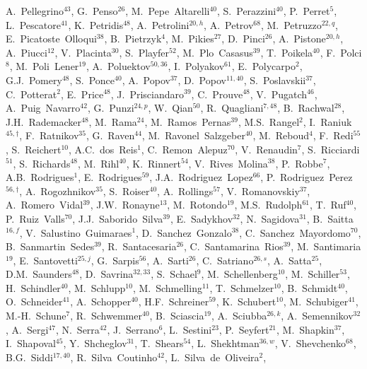 \documentclass[12pt,a4paper]{article}
\begin{document}
\begin{flushleft}
A.~Pellegrino$^{43}$,
G.~Penso$^{26}$,
M.~Pepe~Altarelli$^{40}$,
S.~Perazzini$^{40}$,
P.~Perret$^{5}$,
L.~Pescatore$^{41}$,
K.~Petridis$^{48}$,
A.~Petrolini$^{20,h}$,
A.~Petrov$^{68}$,
M.~Petruzzo$^{22,q}$,
E.~Picatoste~Olloqui$^{38}$,
B.~Pietrzyk$^{4}$,
M.~Pikies$^{27}$,
D.~Pinci$^{26}$,
A.~Pistone$^{20,h}$,
A.~Piucci$^{12}$,
V.~Placinta$^{30}$,
S.~Playfer$^{52}$,
M.~Plo~Casasus$^{39}$,
T.~Poikela$^{40}$,
F.~Polci$^{8}$,
M.~Poli~Lener$^{19}$,
A.~Poluektov$^{50,36}$,
I.~Polyakov$^{61}$,
E.~Polycarpo$^{2}$,
G.J.~Pomery$^{48}$,
S.~Ponce$^{40}$,
A.~Popov$^{37}$,
D.~Popov$^{11,40}$,
S.~Poslavskii$^{37}$,
C.~Potterat$^{2}$,
E.~Price$^{48}$,
J.~Prisciandaro$^{39}$,
C.~Prouve$^{48}$,
V.~Pugatch$^{46}$,
A.~Puig~Navarro$^{42}$,
G.~Punzi$^{24,p}$,
W.~Qian$^{50}$,
R.~Quagliani$^{7,48}$,
B.~Rachwal$^{28}$,
J.H.~Rademacker$^{48}$,
M.~Rama$^{24}$,
M.~Ramos~Pernas$^{39}$,
M.S.~Rangel$^{2}$,
I.~Raniuk$^{45,\dagger}$,
F.~Ratnikov$^{35}$,
G.~Raven$^{44}$,
M.~Ravonel~Salzgeber$^{40}$,
M.~Reboud$^{4}$,
F.~Redi$^{55}$,
S.~Reichert$^{10}$,
A.C.~dos~Reis$^{1}$,
C.~Remon~Alepuz$^{70}$,
V.~Renaudin$^{7}$,
S.~Ricciardi$^{51}$,
S.~Richards$^{48}$,
M.~Rihl$^{40}$,
K.~Rinnert$^{54}$,
V.~Rives~Molina$^{38}$,
P.~Robbe$^{7}$,
A.B.~Rodrigues$^{1}$,
E.~Rodrigues$^{59}$,
J.A.~Rodriguez~Lopez$^{66}$,
P.~Rodriguez~Perez$^{56,\dagger}$,
A.~Rogozhnikov$^{35}$,
S.~Roiser$^{40}$,
A.~Rollings$^{57}$,
V.~Romanovskiy$^{37}$,
A.~Romero~Vidal$^{39}$,
J.W.~Ronayne$^{13}$,
M.~Rotondo$^{19}$,
M.S.~Rudolph$^{61}$,
T.~Ruf$^{40}$,
P.~Ruiz~Valls$^{70}$,
J.J.~Saborido~Silva$^{39}$,
E.~Sadykhov$^{32}$,
N.~Sagidova$^{31}$,
B.~Saitta$^{16,f}$,
V.~Salustino~Guimaraes$^{1}$,
D.~Sanchez~Gonzalo$^{38}$,
C.~Sanchez~Mayordomo$^{70}$,
B.~Sanmartin~Sedes$^{39}$,
R.~Santacesaria$^{26}$,
C.~Santamarina~Rios$^{39}$,
M.~Santimaria$^{19}$,
E.~Santovetti$^{25,j}$,
G.~Sarpis$^{56}$,
A.~Sarti$^{26}$,
C.~Satriano$^{26,s}$,
A.~Satta$^{25}$,
D.M.~Saunders$^{48}$,
D.~Savrina$^{32,33}$,
S.~Schael$^{9}$,
M.~Schellenberg$^{10}$,
M.~Schiller$^{53}$,
H.~Schindler$^{40}$,
M.~Schlupp$^{10}$,
M.~Schmelling$^{11}$,
T.~Schmelzer$^{10}$,
B.~Schmidt$^{40}$,
O.~Schneider$^{41}$,
A.~Schopper$^{40}$,
H.F.~Schreiner$^{59}$,
K.~Schubert$^{10}$,
M.~Schubiger$^{41}$,
M.-H.~Schune$^{7}$,
R.~Schwemmer$^{40}$,
B.~Sciascia$^{19}$,
A.~Sciubba$^{26,k}$,
A.~Semennikov$^{32}$,
A.~Sergi$^{47}$,
N.~Serra$^{42}$,
J.~Serrano$^{6}$,
L.~Sestini$^{23}$,
P.~Seyfert$^{21}$,
M.~Shapkin$^{37}$,
I.~Shapoval$^{45}$,
Y.~Shcheglov$^{31}$,
T.~Shears$^{54}$,
L.~Shekhtman$^{36,w}$,
V.~Shevchenko$^{68}$,
B.G.~Siddi$^{17,40}$,
R.~Silva~Coutinho$^{42}$,
L.~Silva~de~Oliveira$^{2}$,

\end{flushleft}
\end{document}
